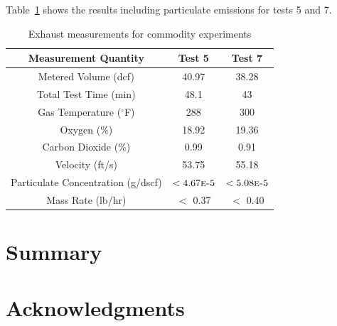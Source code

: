 \documentclass[12pt,oneside]{book}
\begin{document}
Table~\ref{tab:part_data} shows the results including particulate emissions for tests 5 and 7.

\begin{table}[!ht]
\centering
\caption{Exhaust measurements for commodity experiments}
\label{tab:part_data}
\begin{tabular}{ccc}
\toprule[1.25pt]
Measurement Quantity & Test 5 & Test 7  \\
\midrule
Metered Volume (dcf)                &  40.97  &  38.28  \\
Total Test Time (min)               &  48.1   &  43     \\
Gas Temperature ($^{\circ}$F)       &  288    &  300    \\
Oxygen (\%)                         &  18.92  &  19.36  \\
Carbon Dioxide (\%)                 &  0.99   &  0.91   \\
Velocity (ft/s)                     &  53.75  &  55.18  \\
Particulate Concentration (g/dscf)  &  $< 4.67\text{\sc{e}-}5$   &  $< 5.08 \text{\sc{e}-}5$  \\
Mass Rate (lb/hr)                   &  $<$ 0.37   &  $<$ 0.40   \\
\bottomrule[1.25pt]
\end{tabular}
\end{table}


\chapter{Summary}

\chapter{Acknowledgments}



\newpage

\appendix
\end{document}
